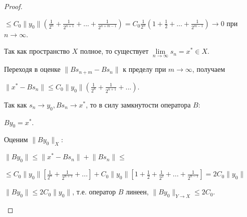\documentclass[12pt,a4paper,titlepage, oneside]{book}
\theoremstyle{definition}
\theoremstyle{plain}
\theoremstyle{remark}
\theoremstyle{remark}
\theoremstyle{remark}
\theoremstyle{remark}
\theoremstyle{plain}
\theoremstyle{plain}
\begin{document}
\begin{proof}
\begin{enumerate}
\begin{center}
$\leq C_0 \lVert y_0 \rVert (\frac{1}{2^n} + \frac{1}{2^{n+1}}+...+\frac{1}{2^{n+m-1}})=C_0 \frac{1}{2^n} (1 + \frac{1}{2}+...+\frac{1}{2^{m-1}}) \to 0$ при $n \to \infty$.
\end{center}

Так как пространство $X$ полное, то существует $\lim \limits_{n \to \infty} s_n=x^* \in X$.

Переходя в оценке $ \lVert B s_{n+m}-B s_n \rVert$ к пределу при $m \to \infty$, получаем

\begin{center}
$ \lVert x^*-B s_n \rVert \leq C_0 \lVert y_0\rVert (\frac{1}{2^n} + \frac{1}{2^{n+1}}+...)$.
\end{center}

Так как $s_n \to y_0, B s_n \to x^*$, то в силу замкнутости оператора $B$: 

\begin{center}
$B y_0=x^* $.
\end{center}

Оценим $\lVert B y_0 \rVert _X$:

\begin{center}
$\lVert B y_0 \rVert \leq \lVert x^* - B s_n \rVert + \lVert B s_n \rVert \leq$ 
\end{center}

\begin{center}
$\leq C_0 \lVert y_0\rVert [\frac{1}{2^n} + \frac{1}{2^{n+1}}+...] + C_0 \lVert y_0\rVert [1+\frac{1}{2} +\frac{1}{2^2}+ ...+\frac{1}{2^{n-1}}]= 2 C_0 \lVert y_0\rVert$
\end{center}

$\lVert B y_0 \rVert \leq 2 C_0 \lVert y_0\rVert$, т.е. оператор $B$ линеен, $ \lVert B y_0 \rVert _{Y \to X} \leq 2 C_0$.

\end{enumerate}

\end{proof}
\end{document}
